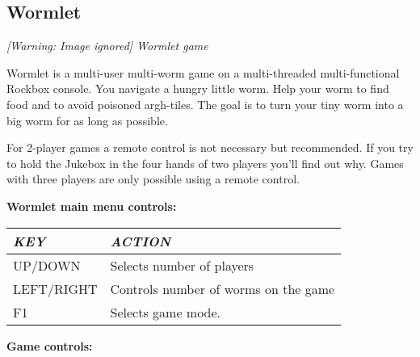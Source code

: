 \subsection{Wormlet}
{\centering\itshape
  [Warning: Image ignored] %
 \newline
Wormlet game
\par}

Wormlet is a multi{}-user multi{}-worm game on a multi{}-threaded
multi{}-functional Rockbox console. You navigate a hungry little worm.
Help your worm to find food and to avoid poisoned argh{}-tiles. The
goal is to turn your tiny worm into a big worm for as long as possible.

For 2{}-player games a remote control is not necessary but recommended.
If you try to hold the Jukebox in the four hands of two players
you'll find out why. Games with three players are only
possible using a remote control.

{\bfseries
Wormlet main menu controls:}

\begin{center}\begin{tabular}{|p{2.55cm}|p{9.958cm}|}
\hline
{\centering\bfseries\itshape
KEY
\par}
&
{\centering\bfseries\itshape
ACTION
\par}
\\\hline
{\centering
UP/DOWN
\par}
&
Selects number of players
\\\hline
{\centering
LEFT/RIGHT
\par}
&
Controls number of worms on the game
\\\hline
{\centering
F1
\par}
&
Selects game mode.
\\\hline
\end{tabular}\end{center}
{\bfseries
Game controls:}


